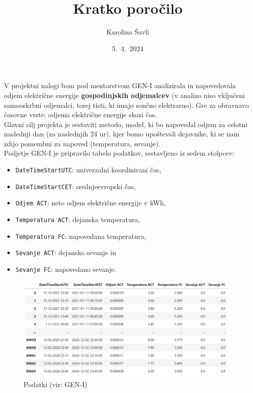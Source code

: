 \documentclass[a4paper, 10pt]{article}
\begin{document}
\title{\textbf{\LARGE{Kratko poročilo}}}
\author{Karolina Šavli}
\date{5.\ 4.\ 2024}

\maketitle


\noindent V projektni nalogi bom pod mentorstvom GEN-I analizirala in napovedovala odjem električne energije 
\textbf{gospodinjskih odjemalcev} (v analizo niso vključeni samooskrbni odjemalci, torej tisti, 
ki imajo sončno elektrarno). Gre za obravnavo časovne vrste; odjema električne energije skozi čas. \\

\noindent Glavni cilj projekta je sestaviti metodo, model, ki bo napovedal odjem za celotni naslednji dan (za naslednjih 24 ur), 
kjer bomo upoštevali dejavnike, ki se nam zdijo pomembni za napoved (temperatura, sevanje). \\

\noindent Podjetje GEN-I je pripravilo tabelo podatkov, sestavljeno iz sedem stolpcev:
\begin{itemize}
    \item  \texttt{DateTimeStartUTC}: univerzalni koordinirani čas,
    \item  \texttt{DateTimeStartCET}: srednjeevropski čas,
    \item  \texttt{Odjem ACT}: neto odjem električne energije v kWh,
    \item  \texttt{Temperatura ACT}: dejanska temperatura, 
    \item  \texttt{Temperatura FC}: napovedana temperatura,
    \item  \texttt{Sevanje ACT}: dejansko sevanje in
    \item  \texttt{Sevanje FC}: napovedano sevanje. 
\end{itemize}

\begin{figure}[h!]
    \centering
    \caption{Podatki (vir: GEN-I)}\par\medskip
    \includegraphics[width=\textwidth]{tabela.png}
\end{figure}
\end{document}
